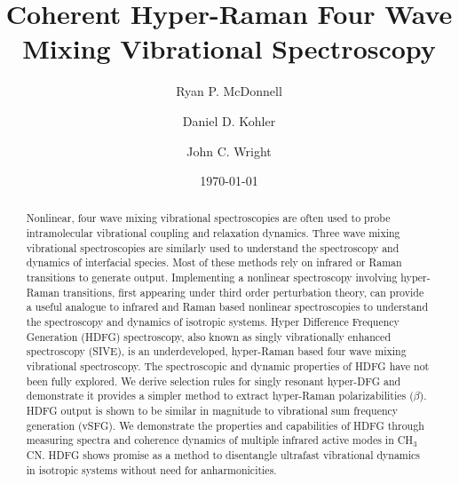 \documentclass[aip, jcp, reprint, onecolumn]{revtex4-2}
\begin{document}
\title{Coherent Hyper-Raman Four Wave Mixing Vibrational Spectroscopy}


\author{Ryan P. McDonnell} 
\author{Daniel D. Kohler}
\author{John C. Wright} 


\date{\today}

\begin{abstract}
Nonlinear, four wave mixing vibrational spectroscopies are often used to probe intramolecular vibrational coupling and relaxation dynamics.
Three wave mixing vibrational spectroscopies are similarly used to understand the spectroscopy and dynamics of interfacial species.
Most of these methods rely on infrared or Raman transitions to generate output. 
Implementing a nonlinear spectroscopy involving hyper-Raman transitions, first appearing under third order perturbation theory, can provide a useful analogue to infrared and Raman based nonlinear spectroscopies to understand the spectroscopy and dynamics of isotropic systems.
Hyper Difference Frequency Generation (HDFG) spectroscopy, also known as singly vibrationally enhanced spectroscopy (SIVE), is an underdeveloped, hyper-Raman based four wave mixing vibrational spectroscopy. 
The spectroscopic and dynamic properties of HDFG have not been fully explored.
We derive selection rules for singly resonant hyper-DFG and demonstrate it provides a simpler method to extract hyper-Raman polarizabilities ($\beta$).
HDFG output is shown to be similar in magnitude to vibrational sum frequency generation (vSFG). 
We demonstrate the properties and capabilities of HDFG through measuring spectra and coherence dynamics of multiple infrared active modes in CH$_3$CN.
HDFG shows promise as a method to disentangle ultrafast vibrational dynamics in isotropic systems without need for anharmonicities.

\end{abstract}

\maketitle
\end{document}
